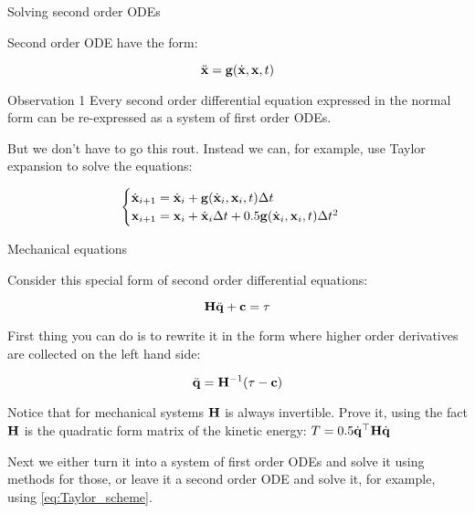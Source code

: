 \documentclass{beamer}
\begin{document}
\begin{frame}{Solving second order ODEs}
\begin{flushleft}

Second order ODE have the form:

\begin{equation}
\label{eq:secondOrderODE}
\ddot{\mathbf{x}} = \mathbf{g}(\dot{\mathbf{x}}, \mathbf{x}, t)
\end{equation}

\begin{block}{Observation 1}
Every second order differential equation expressed in the normal form can be re-expressed as a system of first order ODEs.
\end{block}

But we don't have to go this rout. Instead we can, for example, use Taylor expansion to solve the equations:

\begin{equation}
\label{eq:Taylor_scheme}
\begin{cases}
\dot{\mathbf{x}}_{i+1} = \dot{\mathbf{x}}_i + \mathbf{g}(\dot{\mathbf{x}}_i, \mathbf{x}_i, t) \Delta t \\
\mathbf{x}_{i+1} = \mathbf{x}_i + \dot{\mathbf{x}}_i \Delta t + 0.5 \mathbf{g}(\dot{\mathbf{x}}_i, \mathbf{x}_i, t) \Delta t^2
\end{cases}
\end{equation}

\end{flushleft}
\end{frame}




\begin{frame}{Mechanical equations}
\begin{flushleft}

Consider this special form of second order differential equations:

\begin{equation}
\mathbf{H} \ddot{\mathbf{q}} + \mathbf{c} = \tau
\end{equation}

First thing you can do is to rewrite it in the form where higher order derivatives are collected on the left hand side:

\begin{equation}
\ddot{\mathbf{q}} = \mathbf{H}^{-1} (\tau - \mathbf{c})
\end{equation}

Notice that for mechanical systems $\mathbf{H}$ is always invertible. Prove it, using the fact $\mathbf{H}$ is the quadratic form matrix of the kinetic energy:  $T = 0.5 \dot{\mathbf{q}}^\top\mathbf{H}\dot{\mathbf{q}}$

\bigskip

Next we either turn it into a system of first order ODEs and solve it using methods for those, or leave it a second order ODE and solve it, for example, using \eqref{eq:Taylor_scheme}.

\end{flushleft}
\end{frame}
\end{document}
